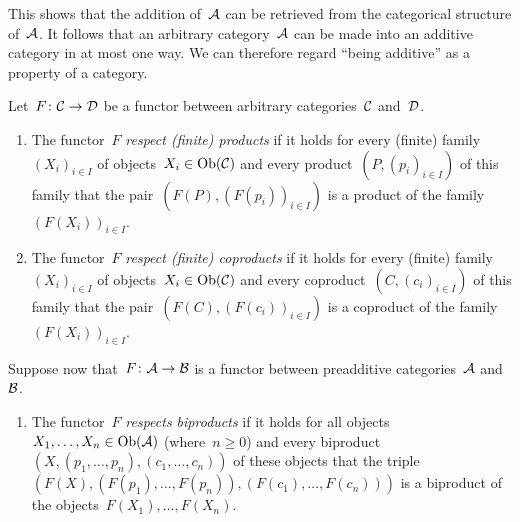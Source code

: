 \begin{remark}
  This shows that the addition of~$\mathcal{A}$ can be retrieved from the categorical structure of~$\mathcal{A}$.
  It follows that an arbitrary category~$\mathcal{A}$ can be made into an additive category in at most one way.
  We can therefore regard \enquote{being additive} as a property of a category.
\end{remark}


\begin{definition}
  Let~$F \colon \mathcal{C} \to \mathcal{D}$ be a functor between arbitrary categories~$\mathcal{C}$ and~$\mathcal{D}$.
  \begin{enumerate}
    \item
      The functor~$F$ \emph{respect \textup(finite\textup) products} if it holds for every (finite) family~$(X_i)_{i \in I}$ of objects~$X_i \in \operatorname{Ob}(\mathcal{C})$ and every product~$(P, (p_i)_{i \in I})$ of this family that the pair~$(F(P), (F(p_i))_{i \in I})$ is a product of the family~$(F(X_i))_{i \in I}$.
    \item
      The functor~$F$ \emph{respect \textup(finite\textup) coproducts} if it holds for every (finite) family~$(X_i)_{i \in I}$ of objects~$X_i \in \operatorname{Ob}(\mathcal{C})$ and every coproduct~$(C, (c_i)_{i \in I})$ of this family that the pair~$(F(C), (F(c_i))_{i \in I})$ is a coproduct of the family~$(F(X_i))_{i \in I}$.
  \end{enumerate}
  Suppose now that~$F \colon \mathcal{A} \to \mathcal{B}$ is a functor between preadditive categories~$\mathcal{A}$ and~$\mathcal{B}$.
  \begin{enumerate}[resume]
    \item
      The functor~$F$ \emph{respects biproducts} if it holds for all objects~$X_1, \dotsc, X_n \in \operatorname{Ob}(\mathcal{A})$ (where~$n \geq 0$) and every biproduct~$(X, (p_1, \dotsc, p_n), (c_1, \dotsc, c_n))$ of these objects that the triple~$(F(X), (F(p_1), \dotsc, F(p_n)), (F(c_1), \dotsc, F(c_n)))$ is a biproduct of the objects~$F(X_1), \dotsc, F(X_n)$.
  \end{enumerate}
\end{definition}


